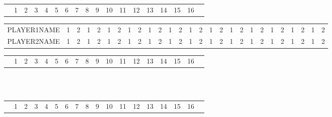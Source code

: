
\begin{table}
\begin{tabular}{p{5cm}|c|c|c|c|c|c!{\vrule width 2pt}c|c|c|c|c|c|c|c|c|c!{\vrule width 3pt}p{1cm}!{\vrule width 3pt}}
& 1 & 2 & 3 & 4 & 5 & 6 & 7 & 8 & 9 & 10 & 11 & 12 & 13 & 14 & 15 & 16 & \\
\end{tabular}
\begin{tabular}{r|c|c|c|c|c|c|c|c|c|c|c|c|c|c|c|c|c|c|c|c|c|c|c|c|c|c|}
\cline{2-27}
\footnotesize PLAYER1NAME & \footnotesize 1 & \footnotesize 2 & \footnotesize 1 & \footnotesize 2 & \footnotesize 1 & \footnotesize 2 & \footnotesize 1 & \footnotesize 2 & \footnotesize 1 & \footnotesize 2 & \footnotesize 1 & \footnotesize 2 & \footnotesize 1 & \footnotesize 2 & \footnotesize 1 & \footnotesize 2 & \footnotesize 1 & \footnotesize 2 & \footnotesize 1 & \footnotesize 2 & \footnotesize 1 & \footnotesize 2 & \footnotesize 1 & \footnotesize 2 & \footnotesize 1 & \footnotesize 2 \\
\cline{1-27}
\cline{1-27}
\footnotesize PLAYER2NAME & \footnotesize 1 & \footnotesize 2 & \footnotesize 1 & \footnotesize 2 & \footnotesize 1 & \footnotesize 2 & \footnotesize 1 & \footnotesize 2 & \footnotesize 1 & \footnotesize 2 & \footnotesize 1 & \footnotesize 2 & \footnotesize 1 & \footnotesize 2 & \footnotesize 1 & \footnotesize 2 & \footnotesize 1 & \footnotesize 2 & \footnotesize 1 & \footnotesize 2 & \footnotesize 1 & \footnotesize 2 & \footnotesize 1 & \footnotesize 2 & \footnotesize 1 & \footnotesize 2 \\
\cline{2-27}
\end{tabular}
\begin{tabular}{p{5cm}|c|c|c|c|c|c!{\vrule width 2pt}c|c|c|c|c|c|c|c|c|c!{\vrule width 3pt}p{1cm}!{\vrule width 3pt}}
& 1 & 2 & 3 & 4 & 5 & 6 & 7 & 8 & 9 & 10 & 11 & 12 & 13 & 14 & 15 & 16 & \\
\end{tabular}
~\\\\
\begin{tabular}{p{5cm}|c|c|c|c|c|c!{\vrule width 2pt}c|c|c|c|c|c|c|c|c|c!{\vrule width 3pt}p{1cm}!{\vrule width 3pt}}
& 1 & 2 & 3 & 4 & 5 & 6 & 7 & 8 & 9 & 10 & 11 & 12 & 13 & 14 & 15 & 16 & \\
\end{tabular}
\begin{tabular}{r|c|c|c|c|c|c|c|c|c|c|c|c|c|c|c|c|c|c|c|c|c|c|c|c|c|c|}

\end{tabular}
\end{table}
